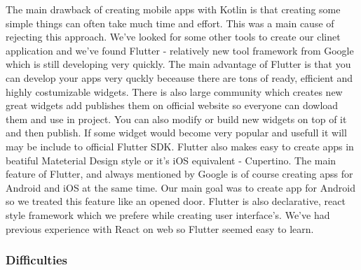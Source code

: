 \documentclass[../Main.tex]{subfiles}
\begin{document}
        The main drawback of creating mobile apps with Kotlin is that creating 
        some simple things can often take much time and effort. 
        This was a main cause of rejecting this approach.
        We've looked for some other tools to create our clinet application and 
        we've found Flutter - relatively new tool framework from Google which 
        is still developing very quickly.
        The main advantage of Flutter is that you can develop your apps very 
        quckly beceause there are tons of ready, efficient and highly costumizable 
        widgets. There is also large community which creates new great widgets 
        add publishes them on official website so everyone can dowload them and use in project.
        You can also modify or build new widgets on top of it and then publish.
        If some widget would become very popular and usefull it will may be 
        include to official Flutter SDK. 
        Flutter also makes easy to create apps in beatiful Mateterial Design 
        style or it's iOS equivalent - Cupertino. 
        The main feature of Flutter, and always mentioned by Google is of course 
        creating apss for Android and iOS at the same time. 
        Our main goal was to create app for Android so we treated this feature like 
        an opened door. 
        Flutter is also declarative, react style framework which we prefere while
        creating user interface's. We've had previous experience with React on web
        so Flutter seemed easy to learn.  
        
    \subsubsection{Difficulties}



\biblio %
\end{document}
